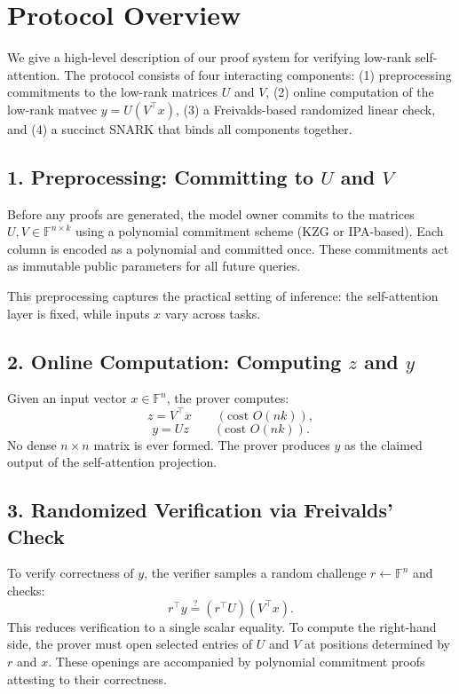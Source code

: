 \documentclass[11pt]{article}
\begin{document}
\section{Protocol Overview}

We give a high-level description of our proof system for verifying 
low-rank self-attention.  
The protocol consists of four interacting components:
(1) preprocessing commitments to the low-rank matrices $U$ and $V$,
(2) online computation of the low-rank matvec $y = U(V^\top x)$,
(3) a Freivalds-based randomized linear check, and
(4) a succinct SNARK that binds all components together.

\subsection{1. Preprocessing: Committing to $U$ and $V$}

Before any proofs are generated, the model owner commits to the matrices
$U, V \in \mathbb{F}^{n \times k}$ using a polynomial commitment 
scheme (KZG or IPA-based).
Each column is encoded as a polynomial and committed once.
These commitments act as immutable public parameters for all future
queries.

This preprocessing captures the practical setting of inference:
the self-attention layer is fixed, while inputs $x$ vary across tasks.

\subsection{2. Online Computation: Computing $z$ and $y$}

Given an input vector $x \in \mathbb{F}^n$, the prover computes:
\[
  z = V^\top x \qquad (\text{cost } O(nk)),
\]
\[
  y = U z \qquad (\text{cost } O(nk)).
\]
No dense $n \times n$ matrix is ever formed.
The prover produces $y$ as the claimed output of the self-attention
projection.

\subsection{3. Randomized Verification via Freivalds' Check}

To verify correctness of $y$, the verifier samples a random challenge
$r \leftarrow \mathbb{F}^n$ and checks:
\[
  r^\top y \stackrel{?}{=} (r^\top U)(V^\top x).
\]
This reduces verification to a single scalar equality.
To compute the right-hand side, the prover must open selected entries of
$U$ and $V$ at positions determined by $r$ and $x$.
These openings are accompanied by polynomial commitment proofs
attesting to their correctness.
\end{document}
